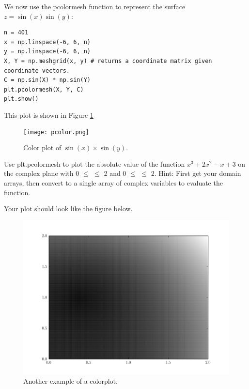 We now use the pcolormesh function to represent 
the surface $z=\sin(x)\sin(y)$:
\begin{lstlisting}
n = 401 
x = np.linspace(-6, 6, n) 
y = np.linspace(-6, 6, n) 
X, Y = np.meshgrid(x, y) # returns a coordinate matrix given coordinate vectors. 
C = np.sin(X) * np.sin(Y) 
plt.pcolormesh(X, Y, C)
plt.show()
\end{lstlisting}
This plot is shown in Figure \ref{fig:pcmexample}
\begin{figure} 
\texttt{[image: pcolor.png]}
\caption{Color plot of $\sin\left(x\right)\times\sin\left(y\right)$.}
\label{fig:pcmexample} 
\end{figure}

\begin{problem} Use plt.pcolormesh to plot the absolute value of the function $x^3 +2x^2 -x +3$ on the complex plane with 0 $\leq$  $\leq$ 2 and 0 $\leq$  $\leq$ 2. Hint: First get your domain arrays, then convert to a single array of complex variables to evaluate the function.

Your plot should look like the figure below.



\begin{figure}[H]
\includegraphics[width=\textwidth]{pcolor2.png}
\caption{Another example of a colorplot.} 
\label{fig:pcolormesh}
\end{figure}
\end{problem}


